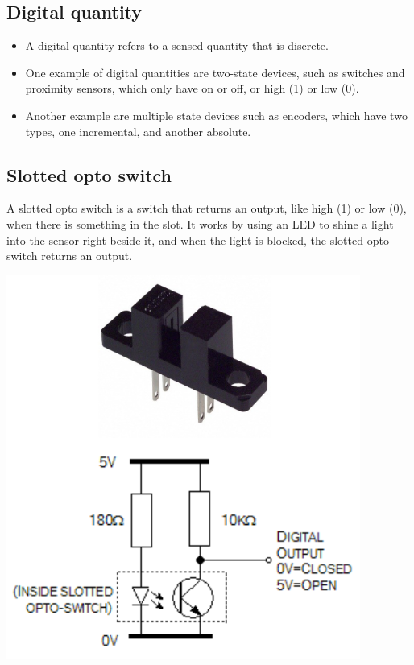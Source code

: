 \documentclass[11pt]{article}
\begin{document}
\subsection{Digital quantity}
\label{sec:orgf3a282a}
\begin{itemize}
\item A digital quantity refers to a sensed quantity that is discrete.
\item One example of digital quantities are two-state devices, such as switches and proximity sensors, which only have on or off, or high (1) or low (0).
\item Another example are multiple state devices such as encoders, which have two types, one incremental, and another absolute.
\end{itemize}
\subsection{Slotted opto switch}
\label{sec:org820dba3}
A slotted opto switch is a switch that returns an output, like high (1) or low (0), when there is something in the slot. It works by using an LED to shine a light into the sensor right beside it, and when the light is blocked, the slotted opto switch returns an output.

\begin{center}
\includegraphics[scale=1]{./images/slotted-opto-switch.png}
\end{center}
\end{document}
